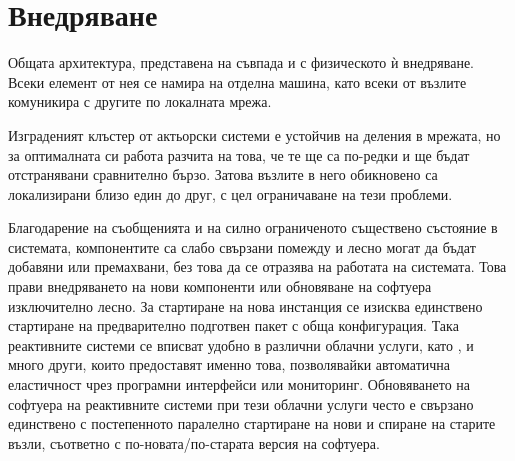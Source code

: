 \section{Внедряване}

Общата архитектура, представена на  съвпада и с физическото ѝ внедряване. Всеки елемент от нея се намира на отделна машина, като всеки от възлите комуникира с другите по локалната мрежа.

Изграденият клъстер от актьорски системи е устойчив на деления в мрежата, но за оптималната си работа разчита на това, че те ще са по-редки и ще бъдат отстранявани сравнително бързо. Затова възлите в него обикновено са локализирани близо един до друг, с цел ограничаване на тези проблеми.

Благодарение на съобщенията и на силно ограниченото съществено състояние в системата, компонентите са слабо свързани помежду и лесно могат да бъдат добавяни или премахвани, без това да се отразява на работата на системата. Това прави внедряването на нови компоненти или обновяване на софтуера изключително лесно. За стартиране на нова инстанция се изисква единствено стартиране на предварително подготвен пакет с обща конфигурация. Така реактивните системи се вписват удобно в различни облачни услуги, като ,  и много други, които предоставят именно това, позволявайки автоматична еластичност чрез програмни интерфейси или мониторинг. Обновяването на софтуера на реактивните системи при тези облачни услуги често е свързано единствено с постепенното паралелно стартиране на нови и спиране на старите възли, съответно с по-новата/по-старата версия на софтуера.
